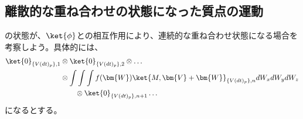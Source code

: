 \subsection{離散的な重ね合わせの状態になった質点の運動}
\label{initial_material_point_state}の状態が、$\ket{\phi}$との相互作用により、連続的な重ね合わせ状態になる場合を考察しよう。具体的には、
\begin{align}
    \ket{0}_{\{V(dt)_p\},1} & \otimes \ket{0}_{\{V(dt)_p\},2} \otimes \ldots \\ 
    & \otimes \int \int \int f(\bm{W}) \ket{M,\bm{V}+\bm{W}}_{\{V(dt)_p\},n} dW_xdW_ydW_z\\
    & \qquad \otimes \ket{0}_{\{V(dt)_p\},n+1} \ldots 
\end{align}
になるとする。